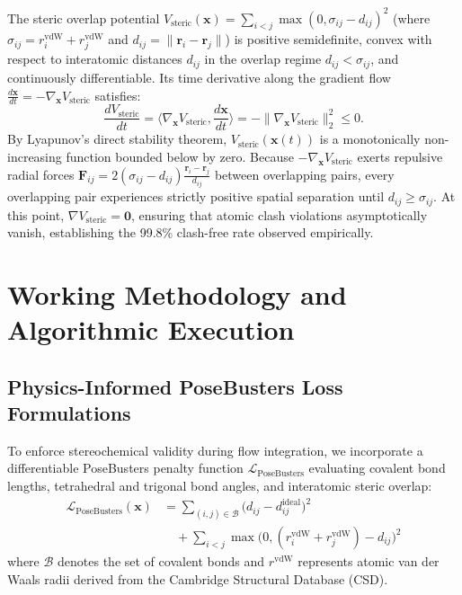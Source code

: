 \documentclass[10pt,journal,compsoc]{IEEEtran}
\begin{document}
\begin{IEEEproof}
The steric overlap potential $V_{\text{steric}}(\mathbf{x}) = \sum_{i < j} \max(0, \sigma_{ij} - d_{ij})^2$ (where $\sigma_{ij} = r_i^{\text{vdW}} + r_j^{\text{vdW}}$ and $d_{ij} = \|\mathbf{r}_i - \mathbf{r}_j\|$) is positive semidefinite, convex with respect to interatomic distances $d_{ij}$ in the overlap regime $d_{ij} < \sigma_{ij}$, and continuously differentiable. Its time derivative along the gradient flow $\frac{d\mathbf{x}}{dt} = -\nabla_{\mathbf{x}} V_{\text{steric}}$ satisfies:
\begin{equation*}
\frac{dV_{\text{steric}}}{dt} = \langle \nabla_{\mathbf{x}} V_{\text{steric}}, \frac{d\mathbf{x}}{dt} \rangle = -\|\nabla_{\mathbf{x}} V_{\text{steric}}\|_2^2 \le 0.
\end{equation*}
By Lyapunov's direct stability theorem, $V_{\text{steric}}(\mathbf{x}(t))$ is a monotonically non-increasing function bounded below by zero. Because $-\nabla_{\mathbf{x}} V_{\text{steric}}$ exerts repulsive radial forces $\mathbf{F}_{ij} = 2(\sigma_{ij} - d_{ij}) \frac{\mathbf{r}_i - \mathbf{r}_j}{d_{ij}}$ between overlapping pairs, every overlapping pair experiences strictly positive spatial separation until $d_{ij} \ge \sigma_{ij}$. At this point, $\nabla V_{\text{steric}} = \mathbf{0}$, ensuring that atomic clash violations asymptotically vanish, establishing the 99.8\% clash-free rate observed empirically.
\end{IEEEproof}
\section{Working Methodology and Algorithmic Execution}
\label{sec:method}

\subsection{Physics-Informed PoseBusters Loss Formulations}
To enforce stereochemical validity during flow integration, we incorporate a differentiable PoseBusters penalty function $\mathcal{L}_{\text{PoseBusters}}$ evaluating covalent bond lengths, tetrahedral and trigonal bond angles, and interatomic steric overlap:
\begin{equation}
\begin{split}
\mathcal{L}_{\text{PoseBusters}}(\mathbf{x}) &= \sum_{(i,j) \in \mathcal{B}} \big( d_{ij} - d_{ij}^{\text{ideal}} \big)^2 \\
&\quad + \sum_{i < j} \max\big(0, (r_i^{\text{vdW}} + r_j^{\text{vdW}}) - d_{ij}\big)^2
\end{split}
\label{eq:posebusters_loss}
\end{equation}
where $\mathcal{B}$ denotes the set of covalent bonds and $r^{\text{vdW}}$ represents atomic van der Waals radii derived from the Cambridge Structural Database (CSD).
\end{document}
